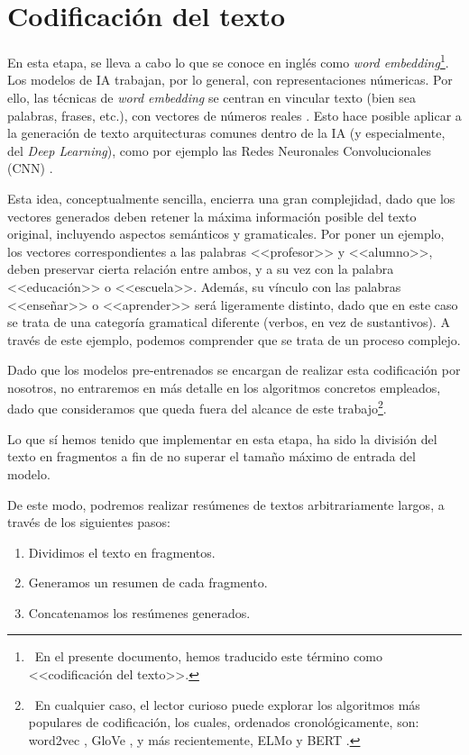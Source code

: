 \bigskip

\section{Codificación del texto} \label{sec:codificacion}

En esta etapa, se lleva a cabo lo que se conoce en inglés como \emph{word embedding}\footnote{\, En el presente documento, hemos traducido este término como <<codificación del texto>>.}. Los modelos de IA trabajan, por lo general, con representaciones númericas. Por ello, las técnicas de \emph{word embedding} se centran en vincular texto (bien sea palabras, frases, etc.), con vectores de números reales \cite{manning19}. Esto hace posible aplicar a la generación de texto arquitecturas comunes dentro de la IA (y especialmente, del \emph{Deep Learning}), como por ejemplo las Redes Neuronales Convolucionales (CNN) \cite{hou20}.

Esta idea, conceptualmente sencilla, encierra una gran complejidad, dado que los vectores generados deben retener la máxima información posible del texto original, incluyendo aspectos semánticos y gramaticales. Por poner un ejemplo, los vectores correspondientes a las palabras <<profesor>> y <<alumno>>, deben preservar cierta relación entre ambos, y a su vez con la palabra <<educación>> o <<escuela>>. Además, su vínculo con las palabras <<enseñar>> o <<aprender>> será ligeramente distinto, dado que en este caso se trata de una categoría gramatical diferente (verbos, en vez de sustantivos). A través de este ejemplo, podemos comprender que se trata de un proceso complejo.

Dado que los modelos pre-entrenados se encargan de realizar esta codificación por nosotros, no entraremos en más detalle en los algoritmos concretos empleados, dado que consideramos que queda fuera del alcance de este trabajo\footnote{\, En cualquier caso, el lector curioso puede explorar los algoritmos más populares de codificación, los cuales, ordenados cronológicamente, son: word2vec \cite{word2vec1, word2vec2}, GloVe \cite{glove14}, y más recientemente, ELMo \cite{elmo18} y BERT \cite{bert18}.}.

Lo que sí hemos tenido que implementar en esta etapa, ha sido la división del texto en fragmentos a fin de no superar el tamaño máximo de entrada del modelo.

De este modo, podremos realizar resúmenes de textos arbitrariamente largos, a través de los siguientes pasos:

\vspace{-\baselineskip}
\begin{enumerate}
	\tightlist
	\item Dividimos el texto en fragmentos.
	\item Generamos un resumen de cada fragmento.
	\item Concatenamos los resúmenes generados.
\end{enumerate}
\vspace{-0.3cm}

